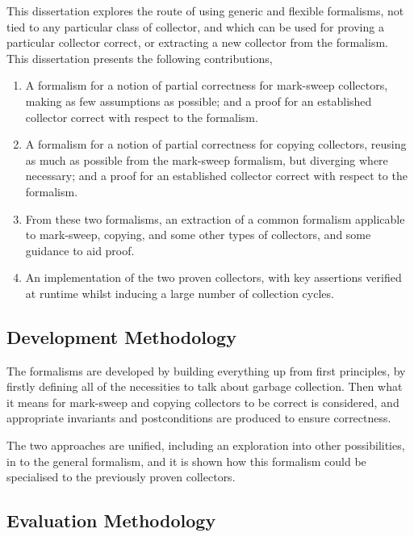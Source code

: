 This dissertation explores the route of using generic and flexible
formalisms, not tied to any particular class of collector, and which
can be used for proving a particular collector correct, or extracting
a new collector from the formalism. This dissertation presents the
following contributions,

\begin{enumerate}
  \item A formalism for a notion of partial correctness for mark-sweep
    collectors, making as few assumptions as possible; and a proof for
    an established collector correct with respect to the formalism.

  \item A formalism for a notion of partial correctness for copying
    collectors, reusing as much as possible from the mark-sweep
    formalism, but diverging where necessary; and a proof for an
    established collector correct with respect to the formalism.

  \item From these two formalisms, an extraction of a common formalism
    applicable to mark-sweep, copying, and some other types of
    collectors, and some guidance to aid proof.

  \item An implementation of the two proven collectors, with key
    assertions verified at runtime whilst inducing a large number of
    collection cycles.
\end{enumerate}

\subsection{Development Methodology}
\label{sec:intro-goals-development}

The formalisms are developed by building everything up from first
principles, by firstly defining all of the necessities to talk about
garbage collection. Then what it means for mark-sweep and copying
collectors to be correct is considered, and appropriate invariants and
postconditions are produced to ensure correctness.

The two approaches are unified, including an exploration into other
possibilities, in to the general formalism, and it is shown how this
formalism could be specialised to the previously proven collectors.

\subsection{Evaluation Methodology}
\label{sec:intro-goals-evaluation}

